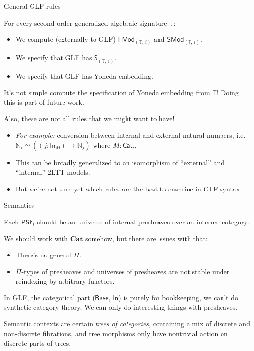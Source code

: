 \documentclass[dvipsnames,aspectratio=169]{beamer}
\newcommand{\mbb}[1]{\mathbb{#1}}
\newcommand{\Base}{\mathsf{Base}}
\newcommand{\In}{\mathsf{In}}
\newcommand{\PSh}{\mathsf{PSh}}
\newcommand{\Cat}{\mathsf{Cat}}
\newcommand{\SMod}{\mathsf{SMod}}
\newcommand{\FMod}{\mathsf{FMod}}
\newcommand{\bCat}{\mathbf{Cat}}
\renewcommand{\S}{\mathsf{S}}
\begin{document}
\begin{frame}{General GLF rules}

For every second-order generalized algebraic signature $\mbb{T}$:
\begin{itemize}
\item We compute (externally to GLF) $\FMod_{(\mbb{T},\,i)}$ and $\SMod_{(\mbb{T},\,i)}$.
\item We specify that GLF has $\S_{(\mbb{T},\,i)}$.
\item We specify that GLF has Yoneda embedding.
\end{itemize}
\vspace{1em}

It's not simple compute the specification of Yoneda embedding from $\mbb{T}$!
Doing this is part of future work.

\pause
\vspace{1em}
Also, these are not all rules that we might want to have!
\begin{itemize}
\item \emph{For example:} conversion between internal and external natural numbers, i.e.\
  $\mbb{N}_i \simeq ((j : \In_M) \to \mbb{N}_j)$ where $M : \Cat_i$.
\item This can be broadly generalized to an isomorphism of ``external'' and ``internal''
  2LTT models.
\item But we're not sure yet which rules are the best to enshrine in GLF syntax.
\end{itemize}


\end{frame}

\begin{frame}{Semantics}

Each $\PSh_i$ should be an universe of internal presheaves over an internal category.
\vspace{1em}

We should work with $\bCat$ somehow, but there are issues with that:
\begin{itemize}
\item There's no general $\Pi$.
\item $\Pi$-types of presheaves and universes of presheaves are not stable under
      reindexing by arbitrary functors.
\end{itemize}
\vspace{1em}

In GLF, the categorical part ($\Base$, $\In$) is purely for bookkeeping, we can't do synthetic
category theory. We can only do interesting things with presheaves.
\vspace{1em}

Semantic contexts are certain \emph{trees of categories}, containing a mix of discrete and
non-discrete fibrations, and tree morphisms only have nontrivial action on discrete parts of trees.

\end{frame}
\end{document}
